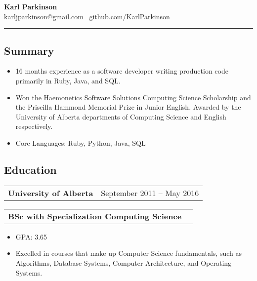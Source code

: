 \documentclass[10pt,letterpaper]{article}
\makeatletter
\newcommand{\headerrow}[2]
{\begin{tabular*}{\linewidth}{l@{\extracolsep{\fill}}r}
	#1 &
	#2 \\
\end{tabular*}}
\makeatother
\begin{document}
\begin{center}
{\LARGE \textbf{Karl Parkinson}}
\\
karljparkinson@gmail.com \textbullet \ github.com/KarlParkinson

\end{center}

\hrule

\subsection*{Summary}
	\begin{itemize}
          \itemsep0em
            \item 16 months experience as a software developer writing production code primarily in Ruby, Java, and SQL.
	    \item Won the Haemonetics Software Solutions Computing Science Scholarship and the Priscilla Hammond Memorial Prize in Junior English. Awarded by the University of Alberta departments of Computing Science and English respectively.
            \item Core Languages: Ruby, Python, Java, SQL
	\end{itemize}
\vspace{-1em}
\subsection*{Education}
	\headerrow
		{\textbf{University of Alberta}}
		{September 2011 -- May 2016}
	\headerrow
		{\textbf{BSc with Specialization Computing Science}}
		{}
	\begin{itemize}
          \itemsep0em
          \item GPA: 3.65
          \item Excelled in courses that make up Computer Science fundamentals, such as Algorithms, Database Systems, Computer Architecture, and Operating Systems.
	\end{itemize}
\vspace{-1em}
\end{document}

